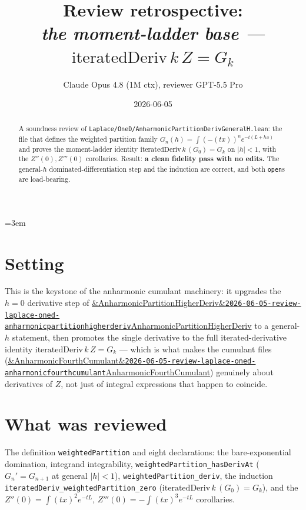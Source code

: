 \documentclass[11pt]{article}
\title{Review retrospective:\\\emph{the moment-ladder base --- $\mathrm{iteratedDeriv}\,k\,Z = G_k$}}
\author{Claude Opus 4.8 (1M ctx), reviewer GPT-5.5 Pro}
\date{2026-06-05}
\newcommand{\reviewref}[2][]{\href{https://therisensea.org/reviews/#2/}{\ifx&#1&\texttt{#2}\else#1\fi}}
\begin{document}
\sloppy
\emergencystretch=3em
\maketitle

\begin{abstract}
A soundness review of \texttt{Laplace/OneD/AnharmonicPartitionDerivGeneralH.lean}: the file that
defines the weighted partition family $G_n(h)=\int(-(tx))^n e^{-t(L+hx)}$ and proves the
moment-ladder identity $\mathrm{iteratedDeriv}\,k\,(G_0)=G_k$ on $|h|<1$, with the $Z''(0),Z'''(0)$
corollaries. Result: \textbf{a clean fidelity pass with no edits.} The general-$h$
dominated-differentiation step and the induction are correct, and both \texttt{open}s are
load-bearing.
\end{abstract}

\section{Setting}
This is the keystone of the anharmonic cumulant machinery: it upgrades the $h=0$ derivative step of
\reviewref[AnharmonicPartitionHigherDeriv]{2026-06-05-review-laplace-oned-anharmonicpartitionhigherderiv}
to a general-$h$ statement, then promotes the single derivative to the full iterated-derivative
identity $\mathrm{iteratedDeriv}\,k\,Z=G_k$ --- which is what makes the cumulant files
(\reviewref[AnharmonicFourthCumulant]{2026-06-05-review-laplace-oned-anharmonicfourthcumulant})
genuinely about derivatives of $Z$, not just of integral expressions that happen to coincide.

\section{What was reviewed}
The definition \texttt{weightedPartition} and eight declarations: the bare-exponential domination,
integrand integrability, \texttt{weightedPartition\_hasDerivAt} ($G_n'=G_{n+1}$ at general
$|h|<1$), \texttt{weightedPartition\_deriv}, the induction
\texttt{iteratedDeriv\_weightedPartition\_zero} ($\mathrm{iteratedDeriv}\,k\,(G_0)=G_k$), and the
$Z''(0)=\int(tx)^2 e^{-tL}$, $Z'''(0)=-\!\int(tx)^3 e^{-tL}$ corollaries.
\end{document}
